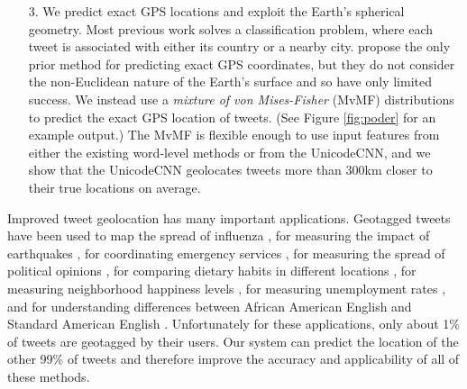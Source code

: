 \documentclass[sigconf,anonymous,review]{acmart}
\newcommand{\defn}[1]{\textit{#1}}
\newcommand{\fixme}[1]{\textcolor{red}{\textbf{FIXME:} {#1}}}
\begin{document}
\begin{enumerate}
\item[3.]
    We predict exact GPS locations and exploit the Earth's spherical geometry.
Most previous work solves a classification problem,
where each tweet is associated with either its country or a nearby city.
\citet{duong2016near} propose the only prior method for predicting exact GPS coordinates,
but they do not consider the non-Euclidean nature of the Earth's surface and so have only limited success.
We instead use a \defn{mixture of von Mises-Fisher} (MvMF) distributions to predict the exact GPS location of tweets.
(See Figure \ref{fig:poder} for an example output.)
The MvMF is flexible enough to use input features from either the existing word-level methods or from the UnicodeCNN,
and we show that the UnicodeCNN geolocates tweets more than 300km closer to their true locations on average.
\end{enumerate}


Improved tweet geolocation has many important applications.
Geotagged tweets have been used to map the spread of influenza \citep{paul2014twitter,santillana2015combining},
for measuring the impact of earthquakes \citep{sakaki2010earthquake},
for coordinating emergency services \citep{klein2012detection,rudra2016summarizing,imran2016twitter,pohl2016online},
for measuring the spread of political opinions \citep{conover2011political,barbera2014birds},
for comparing dietary habits in different locations \citep{widener2014using},
for measuring neighborhood happiness levels \citep{nguyen2016leveraging}, 
for measuring unemployment rates \citep{antenucci2014using,llorente2015social},
and for understanding differences between African American English and Standard American English \citep{huang2016understanding,gonccalves2017fall,blodgett2016demographic}. %
Unfortunately for these applications, only about 1\% of tweets are geotagged by their users.
Our system can predict the location of the other 99\% of tweets and therefore improve the accuracy and applicability of all of these methods.
\end{document}
